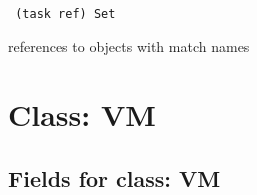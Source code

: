 \vspace{0.3cm}

{\tt 
(task ref) Set
}


references to objects with match names
\vspace{0.3cm}
\vspace{0.3cm}
\vspace{0.3cm}

\vspace{1cm}
\newpage
\section{Class: VM}
\subsection{Fields for class: VM}
